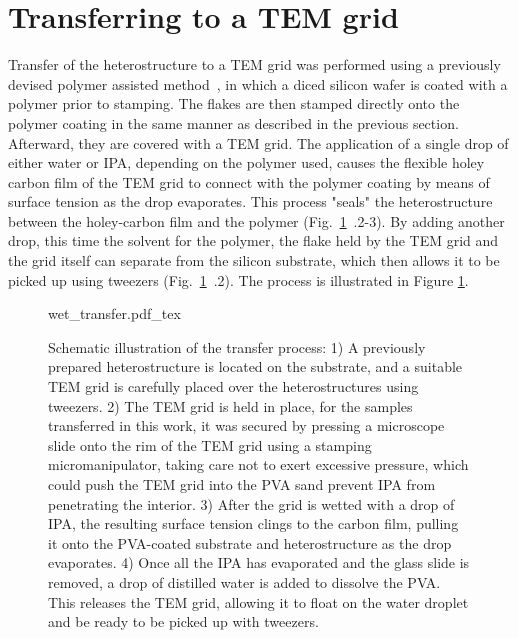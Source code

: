 \section{Transferring to a TEM grid}

Transfer of the heterostructure to a TEM grid was performed using a previously devised polymer assisted method~\cite{kosterPolymerassistedTEMSpecimen2021}, in which a diced silicon wafer is coated with a polymer prior to stamping.
%
The flakes are then stamped directly onto the polymer coating in the same manner as described in the previous section. Afterward, they are covered with a TEM grid. The application of a single drop of either water or IPA,  depending on the polymer used, causes the flexible holey carbon film of the TEM grid to connect with the polymer coating by means of surface tension as the drop evaporates. This process "seals" the heterostructure between the holey-carbon film and the polymer (Fig.~\ref{fig:wet_transfer}~.2-3). By adding another drop, this time the solvent for the polymer, the flake held by the TEM grid and the grid itself can separate from the silicon substrate, which then allows it to be picked up using tweezers (Fig.~\ref{fig:wet_transfer}~.2). The process is illustrated in Figure \ref{fig:wet_transfer}.

\begin{figure}[h]
	\centering
	\def\svgwidth{1\linewidth}
	{wet_transfer.pdf_tex}
	\caption{Schematic illustration of the transfer process: 1) A previously prepared heterostructure is located on the substrate, and a suitable TEM grid is carefully placed over the heterostructures using tweezers. 2) The TEM grid is held in place, for the samples transferred in this work, it was secured by pressing a microscope slide onto the rim of the TEM grid using a stamping micromanipulator, taking care not to exert excessive pressure, which could push the TEM grid into the PVA sand prevent IPA from penetrating the interior. 3) After the grid is wetted with a drop of IPA, the resulting surface tension clings to the carbon film, pulling it onto the PVA-coated substrate and heterostructure as the drop evaporates. 4) Once all the IPA has evaporated and the glass slide is removed, a drop of distilled water is added to dissolve the PVA. This releases the TEM grid, allowing it to float on the water droplet and be ready to be picked up with tweezers.}
	\label{fig:wet_transfer}
\end{figure}

